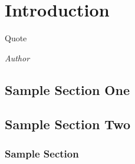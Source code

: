 \documentclass[class=report,11pt,crop=false]{standalone}
\begin{document}
\chapter{Introduction}
\epigraph{Quote}%
    {\emph{Author}}

\section{Sample Section One}

\blindmathpaper

\section{Sample Section Two}

\blindmathpaper

\subsection{Sample Section}

\blindtext












\ifstandalone

\fi
\end{document}
